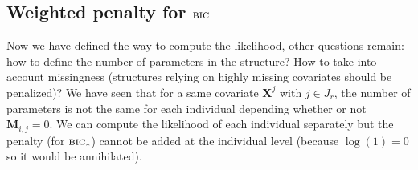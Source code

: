 \documentclass[12pt,a4paper]{report}
\begin{document}
%
%
%
	\subsection{Weighted penalty for $\mbox{{\sc bic}}$}
			Now we have defined the way to compute the likelihood, other questions remain: how to define the number of parameters in the structure? How to take into account missingness (structures relying on highly missing covariates should be penalized)?
			We have seen that for a same covariate $\boldsymbol{X}^j$ with $ j \in J_r$, the number of parameters is not the same for each individual depending whether or not $\boldsymbol{M}_{i,j}=0$. We can compute the likelihood of each individual separately but the penalty (for $\mbox{{\sc bic}}_*$) cannot be added at the individual level (because $\log(1)=0$ so it would be annihilated). \\
			
\end{document}
